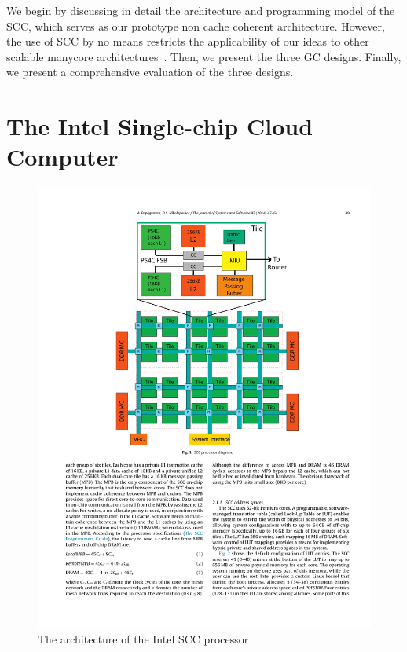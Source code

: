 We begin by discussing in detail the architecture and programming model of the
SCC, which serves as our prototype non cache coherent architecture. However,
the use of SCC by no means restricts the applicability of our ideas to other
scalable manycore architectures~\cite{mmgc}. Then, we present the three GC
designs. Finally, we present a comprehensive evaluation of the three designs.

\section{The Intel Single-chip Cloud Computer}

\begin{figure}
\begin{center}
\includegraphics{Figures/SCC.pdf}
\end{center}
\caption{The architecture of the Intel SCC processor}
\label{fig:scc}
\end{figure}

